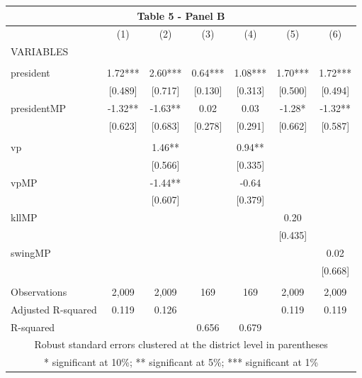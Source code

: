 \begin{tabular}{lcccccc}
\multicolumn{7}{c}{Table 5 - Panel B} \\ \hline
 & (1) & (2) & (3) & (4) & (5) & (6) \\
VARIABLES &  &  &  &  &  &  \\ \hline
 &  &  &  &  &  &  \\
president & 1.72*** & 2.60*** & 0.64*** & 1.08*** & 1.70*** & 1.72*** \\
 & [0.489] & [0.717] & [0.130] & [0.313] & [0.500] & [0.494] \\
presidentMP & -1.32** & -1.63** & 0.02 & 0.03 & -1.28* & -1.32** \\
 & [0.623] & [0.683] & [0.278] & [0.291] & [0.662] & [0.587] \\
 &  &  &  &  &  &  \\
vp &  & 1.46** &  & 0.94** &  &  \\
 &  & [0.566] &  & [0.335] &  &  \\
vpMP &  & -1.44** &  & -0.64 &  &  \\
 &  & [0.607] &  & [0.379] &  &  \\
kllMP &  &  &  &  & 0.20 &  \\
 &  &  &  &  & [0.435] &  \\
swingMP &  &  &  &  &  & 0.02 \\
 &  &  &  &  &  & [0.668] \\
 &  &  &  &  &  &  \\
Observations & 2,009 & 2,009 & 169 & 169 & 2,009 & 2,009 \\
Adjusted R-squared & 0.119 & 0.126 &  &  & 0.119 & 0.119 \\
 R-squared &  &  & 0.656 & 0.679 &  &  \\ \hline
\multicolumn{7}{c}{ Robust standard errors clustered at the district level in parentheses} \\
\multicolumn{7}{c}{ * significant at 10\%; ** significant at 5\%; *** significant at 1\%} \\
\end{tabular}
